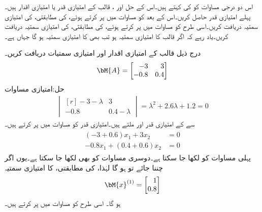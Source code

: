اس دو درجی مساوات کو  کی  کہتے ہیں۔اس کے حل  اور ، قالب  کے امتیازی قدر یا امتیازی اقدار ہیں۔پہلے امتیازی قدر حاصل کریں۔اس کے بعد  کو مساوات  میں پر کرتے ہوئے،  کی مطابقتی،  کی امتیازی سمتیہ  دریافت کریں۔اسی طرح  کو مساوات  میں پر کرتے ہوئے،  کی مطابقتی،  کی امتیازی سمتیہ  دریافت کریں۔یاد رہے کہ اگر  قالب  کا امتیازی سمتیہ ہو تب  بھی  کا امتیازی سمتیہ ہو گا جہاں  ہے۔

درج ذیل قالب کے امتیازی اقدار اور امتیازی سمتیات دریافت کریں۔
\begin{align*}
\bM{A}=
\begin{bmatrix*}[r]
-3& 3\\
-0.8&0.4
\end{bmatrix*}
\end{align*}
حل:امتیازی مساوات
\begin{align*}
\begin{vmatrix*}[r]
-3-\lambda&3\\
-0.8&0.4-\lambda
\end{vmatrix*}=\lambda^2+2.6\lambda+1.2=0
\end{align*}
سے  کے امتیازی قدر  اور  ملتے ہیں۔امتیازی قدر  کو مساوات  میں پر کرتے ہیں۔
\begin{gather*}
\begin{aligned}
(-3+0.6)x_1+3x_2&=0\\
-0.8x_1+(0.4+0.6)x_2&=0
\end{aligned}
\end{gather*}
پہلی مساوات کو  لکھا جا سکتا ہے۔دوسری مساوات کو بھی  لکھا جا سکتا ہے۔یوں اگر  چننا جائے تو   ہو گا لہٰذا،  کی مطابقتی،  کا امتیازی سمتیہ 
\begin{align*}
\bM{x}^{(1)}=
\begin{bmatrix*}[r]
1\\
0.8
\end{bmatrix*}
\end{align*}
ہو گا۔ اسی طرح  کو مساوات  میں پر کرتے ہیں۔
